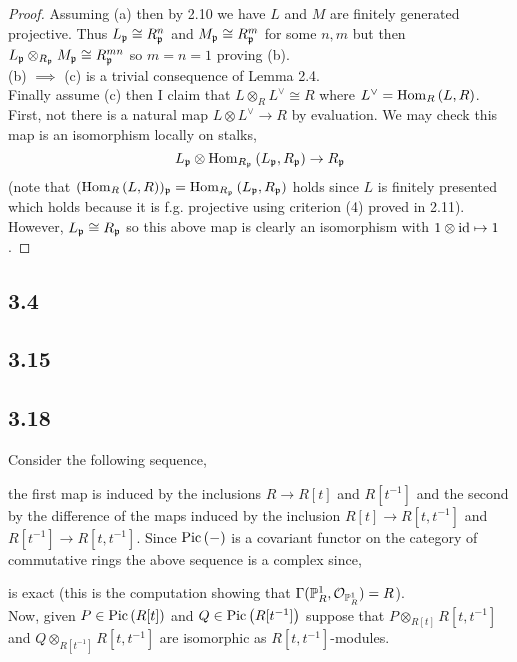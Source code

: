 \documentclass[12pt]{article}
\begin{document}
\begin{proof}
Assuming (a) then by 2.10 we have $L$ and $M$ are finitely generated projective. Thus $L_{\mathfrak{p}} \cong R_{\mathfrak{p}}^n$ and $M_{\mathfrak{p}} \cong R_{\mathfrak{p}}^m$ for some $n,m$ but then $L_{\mathfrak{p}} \otimes_{R_{\mathfrak{p}}} M_{\mathfrak{p}} \cong R_{\mathfrak{p}}^{mn}$ so $m = n = 1$ proving (b).
\bigskip\\
(b) $\implies$ (c) is a trivial consequence of Lemma 2.4.
\bigskip\\
Finally assume (c) then I claim that $L \otimes_R L^\vee \cong R$ where $L^\vee = \mathrm{Hom}_{R} \left( L, R \right)$. First, not there is a natural map $L \otimes L^\vee \to R$ by evaluation. We may check this map is an isomorphism locally on stalks,
\[ L_{\mathfrak{p}} \otimes \mathrm{Hom}_{R_{\mathfrak{p}}} \left( L_{\mathfrak{p}}, R_{\mathfrak{p}} \right) \to R_{\mathfrak{p}} \]
(note that $(\mathrm{Hom}_{R} \left( L, R \right))_{\mathfrak{p}} = \mathrm{Hom}_{R_{\mathfrak{p}}} \left( L_{\mathfrak{p}}, R_{\mathfrak{p}} \right)$ holds since $L$ is finitely presented which holds because it is f.g. projective using criterion (4) proved in 2.11). However, $L_{\mathfrak{p}} \cong R_{\mathfrak{p}}$ so this above map is clearly an isomorphism with $1 \otimes \mathrm{id} \mapsto 1$.  
\end{proof}

\subsection{3.4}

\subsection{3.15}

\subsection{3.18}

Consider the following sequence,
\begin{center}
\end{center}
the first map is induced by the inclusions $R \to R[t]$ and $R[t^{-1}]$ and the second by the difference of the maps induced by the inclusion $R[t] \to R[t, t^{-1}]$ and $R[t^{-1}] \to R[t, t^{-1}]$. Since $\mathrm{Pic} \left( - \right)$ is a covariant functor on the category of commutative rings the above sequence is a complex since,
\begin{center}
\end{center}
is exact (this is the computation showing that $\Gamma(\mathbb{P}^1_R, \mathcal{O}_{\mathbb{P}^1_R}) = R$). 
\bigskip\\
Now, given $P \in \mathrm{Pic} \left( R[t] \right)$ and $Q \in \mathrm{Pic} \left( R[t^{-1}] \right)$ suppose that $P \otimes_{R[t]} R[t, t^{-1}]$ and $Q \otimes_{R[t^{-1}]} R[t, t^{-1}]$ are isomorphic as $R[t, t^{-1}]$-modules.
\end{document}
